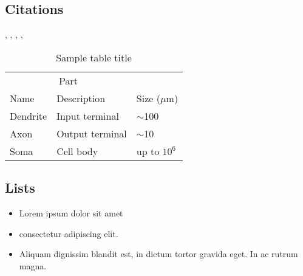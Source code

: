 \documentclass{article}
\begin{document}
\subsection{Citations}

\cite{kingma2014adam}, \cite{jahani2021doubly}, \cite{sadiev2022stochastic}, \cite{beznosikov2022scaled}, \cite{stich2019unified}



\begin{table}
	\caption{Sample table title}
	\centering
	\begin{tabular}{lll}
		\toprule
		\multicolumn{2}{c}{Part}                   \\
		\cmidrule(r){1-2}
		Name     & Description     & Size ($\mu$m) \\
		\midrule
		Dendrite & Input terminal  & $\sim$100     \\
		Axon     & Output terminal & $\sim$10      \\
		Soma     & Cell body       & up to $10^6$  \\
		\bottomrule
	\end{tabular}
	\label{tab:table}
\end{table}
\fi
{}
\subsection{Lists}
\begin{itemize}
	\item Lorem ipsum dolor sit amet
	\item consectetur adipiscing elit.
	\item Aliquam dignissim blandit est, in dictum tortor gravida eget. In ac rutrum magna.
\end{itemize}
\fi



\end{document}
